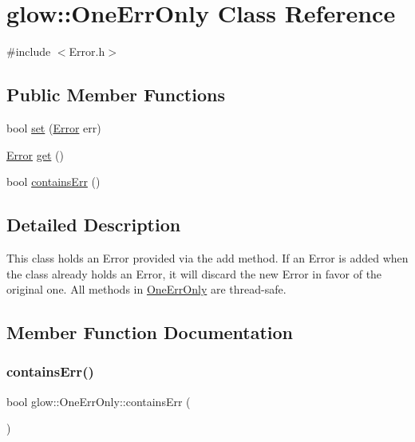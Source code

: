 \hypertarget{classglow_1_1_one_err_only}{}\section{glow\+:\+:One\+Err\+Only Class Reference}
\label{classglow_1_1_one_err_only}


{\ttfamily \#include $<$Error.\+h$>$}

\subsection*{Public Member Functions}
\begin{DoxyCompactItemize}
\item 
bool \hyperlink{classglow_1_1_one_err_only_a09102f1c51e1431e53b52150e57df247}{set} (\hyperlink{namespaceglow_afdb176c3a672ef66db0ecfc19a8d39bf}{Error} err)
\item 
\hyperlink{namespaceglow_afdb176c3a672ef66db0ecfc19a8d39bf}{Error} \hyperlink{classglow_1_1_one_err_only_aaa1698514bac6aae1a6f1396e1310713}{get} ()
\item 
bool \hyperlink{classglow_1_1_one_err_only_ada443508e5ef1493096a065387507254}{contains\+Err} ()
\end{DoxyCompactItemize}


\subsection{Detailed Description}
This class holds an Error provided via the add method. If an Error is added when the class already holds an Error, it will discard the new Error in favor of the original one. All methods in \hyperlink{classglow_1_1_one_err_only}{One\+Err\+Only} are thread-\/safe. 

\subsection{Member Function Documentation}
\mbox{\label{classglow_1_1_one_err_only_ada443508e5ef1493096a065387507254}} 
\subsubsection{\texorpdfstring{contains\+Err()}{containsErr()}}
{\footnotesize\ttfamily bool glow\+::\+One\+Err\+Only\+::contains\+Err (\begin{DoxyParamCaption}{ }\end{DoxyParamCaption})}


